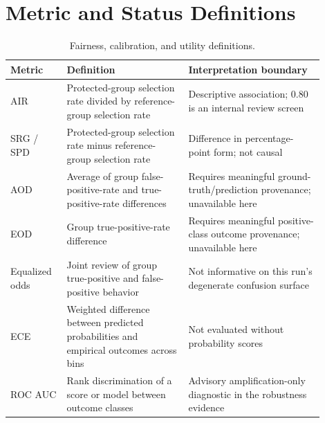 \section{Metric and Status Definitions}
\label{app:metrics}

\begin{table}[htbp]
\centering
\footnotesize
\AccessibleTableHeaderRow
\begin{tabular}{@{}>{\RaggedRight\arraybackslash}p{0.16\linewidth}
                    >{\RaggedRight\arraybackslash}p{0.35\linewidth}
                    >{\RaggedRight\arraybackslash}p{0.39\linewidth}@{}}
\toprule
Metric & Definition & Interpretation boundary \\
\midrule
AIR & Protected-group selection rate divided by reference-group selection rate & Descriptive association; 0.80 is an internal review screen \\
SRG / SPD & Protected-group selection rate minus reference-group selection rate & Difference in percentage-point form; not causal \\
AOD & Average of group false-positive-rate and true-positive-rate differences & Requires meaningful ground-truth/prediction provenance; unavailable here \\
EOD & Group true-positive-rate difference & Requires meaningful positive-class outcome provenance; unavailable here \\
Equalized odds & Joint review of group true-positive and false-positive behavior & Not informative on this run's degenerate confusion surface \\
ECE & Weighted difference between predicted probabilities and empirical outcomes across bins & Not evaluated without probability scores \\
ROC AUC & Rank discrimination of a score or model between outcome classes & Advisory amplification-only diagnostic in the robustness evidence \\
\bottomrule
\end{tabular}
\caption{Fairness, calibration, and utility definitions.}
\label{tab:metric-definitions}
\end{table}


